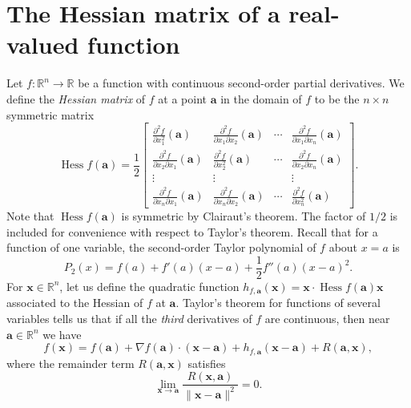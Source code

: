 \documentclass[12pt,letterpaper]{article}
\newcommand{\R}{\mathbb{R}}
\newcommand{\x}{\mathbf{x}}
\renewcommand{\a}{\mathbf{a}}
\DeclareMathOperator{\Hess}{Hess}
\begin{document}
\section{The Hessian matrix of a real-valued function}
Let $f:\R^n\to \R$ be a function with continuous second-order partial derivatives. We define the {\em Hessian matrix} of $f$ at a point $\a$ in the domain of $f$ to be the $n\times n$ symmetric matrix
\[
\Hess f(\a) = \frac{1}{2}\begin{bmatrix}
\frac{\partial^2 f}{\partial x_1^2}(\a) & \frac{\partial^2 f}{\partial x_1\partial x_2}(\a)&\cdots &\frac{\partial^2 f}{\partial x_1\partial x_n}(\a)\\
\frac{\partial^2 f}{\partial x_2\partial x_1}(\a) & \frac{\partial^2 f}{\partial x_2^2}(\a)&\cdots &\frac{\partial^2 f}{\partial x_2\partial x_n}(\a)\\
\vdots & \vdots & & \vdots \\
\frac{\partial^2 f}{\partial x_n\partial x_1}(\a) & \frac{\partial^2 f}{\partial x_n\partial x_2}(\a)&\cdots &\frac{\partial^2 f}{\partial x_n^2}(\a)
\end{bmatrix}.
\]
Note that $\Hess f(\a)$ is symmetric by Clairaut's theorem. The factor of $1/2$ is included for convenience with respect to Taylor's theorem. Recall that for a function of one variable, the second-order Taylor polynomial of $f$ about $x=a$ is 
\[
P_2(x)=f(a)+f'(a)(x-a)+\frac{1}{2}f''(a)(x-a)^2.
\] 
For $\x\in\R^n$, let us define the quadratic function $h_{f,\a}(\x) = \x\cdot \Hess f(\a)\x$ associated to the Hessian of $f$ at $\a$. Taylor's theorem for functions of several variables tells us that if all the {\em third} derivatives of $f$ are continuous, then near $\a\in\R^n$ we have
\begin{equation}\label{e1}
f(\x) = f(\a) + \nabla f(\a)\cdot (\x-\a) + h_{f,\a}(\x-\a) + R(\a,\x),
\end{equation}
where the remainder term $R(\a,\x)$ satisfies
\begin{equation}\label{e2}
\lim_{\x\to\a}\frac{R(\x,\a)}{\lVert \x-\a\rVert^2}=0.
\end{equation}
\end{document}
